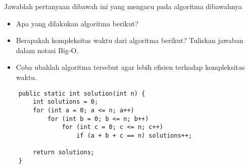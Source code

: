 \documentclass{../praktikum-ppt}
\begin{document}
\begin{frame}[fragile]
  \begin{latihan}
    Jawablah pertanyaan dibawah ini yang mengacu pada algoritma dibawahnya
    \begin{itemize}
      \item Apa yang dilakukan algoritma berikut?
      \item Berapakah kompleksitas waktu dari algoritma berikut? Tuliskan jawaban dalam notasi Big-O.
      \item Coba ubahlah algoritma tersebut agar lebih efisien terhadap kompleksitas waktu.
    \end{itemize}
  \end{latihan}
  \begin{lstlisting}
    public static int solution(int n) {
        int solutions = 0;
        for (int a = 0; a <= n; a++) 
            for (int b = 0; b <= n; b++) 
                for (int c = 0; c <= n; c++) 
                    if (a + b + c == n) solutions++;

        return solutions;
    }
  \end{lstlisting}
\end{frame}
\end{document}
